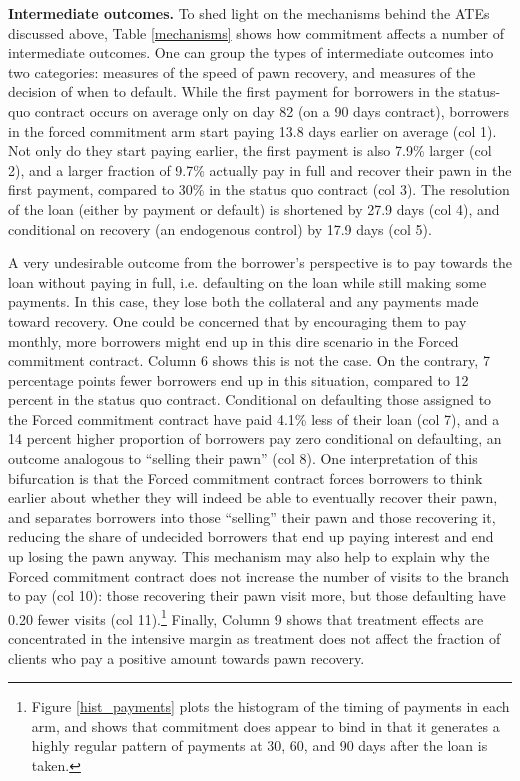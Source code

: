 \documentclass[11pt, a4paper]{article}
\begin{document}
\vspace{.2in}
\noindent \textbf{Intermediate outcomes.} To shed light on the mechanisms behind the ATEs discussed above, Table \ref{mechanisms} shows how commitment affects a number of intermediate outcomes. One can group the types of intermediate outcomes into two categories: measures of the speed of pawn recovery, and measures of the decision of when to default. While the first payment for borrowers in the status-quo contract occurs on average only on day 82 (on a 90 days contract), borrowers in the forced commitment arm start paying 13.8 days earlier on average (col 1). Not only do they start paying earlier, the first payment is also 7.9\% larger (col 2), and a larger fraction of 9.7\% actually pay in full and recover their pawn in the first payment, compared to 30\% in the status quo contract (col 3). The resolution of the loan (either by payment or default) is shortened by 27.9 days (col 4), and conditional on recovery (an endogenous control) by 17.9 days (col 5).

A very undesirable outcome from the borrower's perspective is to pay towards the loan without paying in full, i.e. defaulting on the loan while still making some payments. In this case, they lose both the collateral and any payments made toward recovery. One could be concerned that by encouraging them to pay monthly, more borrowers might end up in this dire scenario in the Forced commitment contract. Column 6 shows this is not the case. On the contrary, 7 percentage points fewer borrowers end up in this situation, compared to 12 percent in the status quo contract. Conditional on defaulting those assigned to the Forced commitment contract have paid 4.1\% less of their loan (col 7), and a 14 percent higher proportion of borrowers pay zero conditional on defaulting, an outcome analogous to
``selling their pawn'' (col 8). One interpretation of this bifurcation is that the Forced commitment contract forces borrowers to think earlier about whether they will indeed be able to eventually recover their pawn, and separates borrowers into those ``selling'' their pawn and those recovering it, reducing the share of undecided borrowers that end up paying interest and end up losing the pawn anyway. This mechanism may also help to explain why the Forced commitment contract does not increase the number of visits to the branch to pay (col 10): those recovering their pawn visit more, but those defaulting have 0.20 fewer visits (col 11).\footnote{Figure \ref{hist_payments} plots the histogram of the timing of payments in each arm, and shows that commitment does appear to bind in that it generates a highly regular pattern of payments at 30, 60, and 90 days after the loan is taken.} Finally, Column 9 shows that treatment effects are concentrated in the intensive margin as treatment does not affect the fraction of clients who pay a positive amount towards pawn recovery.
\end{document}
